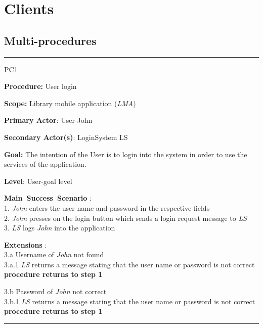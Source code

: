 \section{Clients}
\label{chap:usage_guide}

\subsection{Multi-procedures}

\vspace{0.5cm}
\hrule
\begin{lyxlist}{PC1}
\small{
\item [\textbf{Procedure:}] User login
\item [\textbf{Scope:}] Library mobile application (\emph{LMA})
\item [\textbf{Primary Actor}:] User John
\item [\textbf{Secondary Actor(s)}:] LoginSystem LS
\item [\textbf{Goal:}] The intention of the User is to login into the system in
order to use the services of the application.
\item [\textbf{Level}:] User-goal level
\item [\textbf{Main~Success~Scenario}]:\\
1. \emph{John} enters the user name and password in the respective fields\\
2. \emph{John} presses on the login button which sends a login request message
to \emph{LS}\\
3. \emph{LS} logs \emph{John} into the application\\


\item [\textbf{Extensions}]:\\
3.a Username of \emph{John} not found\\
\hspace*{0.5cm} 3.a.1 \emph{LS} returns a message stating that the user name
or password is not correct \\
\hspace*{0.5cm} \textbf{procedure returns to step 1}

3.b Password of \emph{John} not correct \\
\hspace*{0.5cm} 3.b.1 \emph{LS} returns a message stating that the user name
or password is not correct \\
\hspace*{0.5cm} \textbf{procedure returns to step 1}

}

\end{lyxlist}
\hrule

